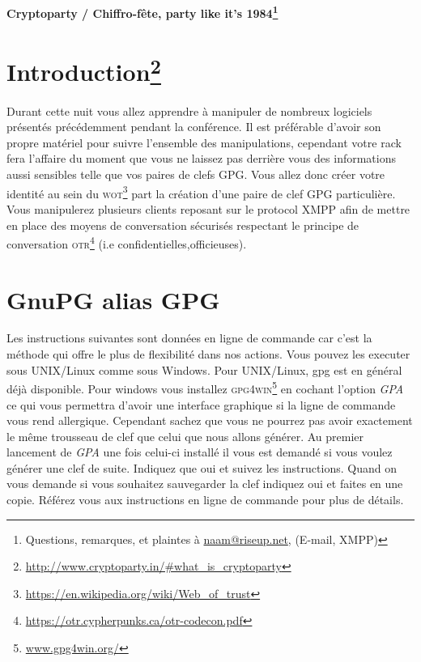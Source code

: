 \documentclass[a4paper]{article}
\begin{document}
\begin{center}
{\Large
    {\bf Cryptoparty / Chiffro-fête, party like it's
            \textsc{1984}\protect\footnote{Questions, remarques, et plaintes à
    \url{naam@riseup.net}, (E-mail, XMPP)}
   }
}
\end{center}

\bigskip

\section*{Introduction\protect\footnote{\url{http://www.cryptoparty.in/\#what\_is\_cryptoparty}}}

Durant cette nuit vous allez apprendre à manipuler de nombreux logiciels
présentés précédemment pendant la conférence. Il est préférable d'avoir son
propre matériel pour suivre l'ensemble des manipulations, cependant votre rack
fera l'affaire du moment que vous ne laissez pas derrière vous des informations
aussi sensibles telle que vos paires de clefs \textsc{GPG}. Vous allez donc créer votre
identité au sein du \textsc{wot\protect\footnote{\url{https://en.wikipedia.org/wiki/Web_of_trust}}}
part la création d'une paire de clef GPG particulière. Vous manipulerez
plusieurs clients reposant sur le protocol XMPP afin de mettre en place des
moyens de conversation sécurisés respectant le principe de conversation
\textsc{otr\protect\footnote{\url{https://otr.cypherpunks.ca/otr-codecon.pdf}}}
(i.e confidentielles,officieuses).

\section{GnuPG alias GPG}

Les instructions suivantes sont données en ligne de commande car c'est la méthode qui
offre le plus de flexibilité dans nos actions. Vous pouvez les executer sous UNIX/Linux comme sous Windows.
Pour UNIX/Linux, gpg est en général déjà disponible. Pour windows vous installez \textsc{gpg4win}\protect\footnote{\url{www.gpg4win.org/}}
en cochant l'option \emph{GPA} ce qui vous permettra d'avoir une interface graphique si la ligne de commande vous rend
allergique. Cependant sachez que vous ne pourrez pas avoir exactement le même trousseau de clef que celui que nous allons générer.
Au premier lancement de \emph{GPA} une fois celui-ci installé il vous est demandé si vous voulez générer une clef de suite. Indiquez que
oui et suivez les instructions. Quand on vous demande si vous souhaitez sauvegarder la clef indiquez oui et faites en une copie. Référez
vous aux instructions en ligne de commande pour plus de détails.
\end{document}
